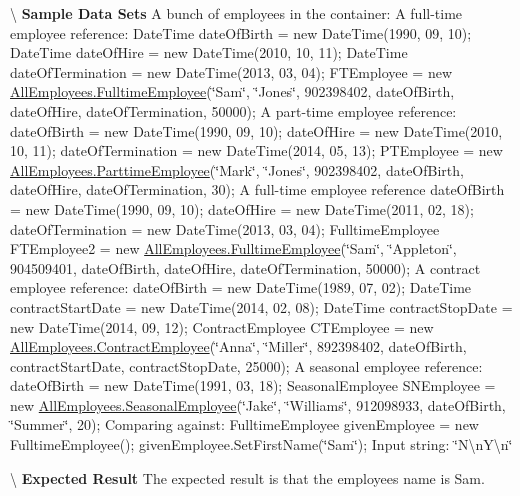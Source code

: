 \textbackslash{} {\bfseries  Sample Data Sets} A bunch of employees in the container\+: A full-\/time employee reference\+: Date\+Time date\+Of\+Birth = new Date\+Time(1990, 09, 10); Date\+Time date\+Of\+Hire = new Date\+Time(2010, 10, 11); Date\+Time date\+Of\+Termination = new Date\+Time(2013, 03, 04); F\+T\+Employee = new \hyperlink{class_all_employees_1_1_fulltime_employee}{All\+Employees.\+Fulltime\+Employee}(\char`\"{}\+Sam\char`\"{}, \char`\"{}\+Jones\char`\"{}, 902398402, date\+Of\+Birth, date\+Of\+Hire, date\+Of\+Termination, 50000); A part-\/time employee reference\+: date\+Of\+Birth = new Date\+Time(1990, 09, 10); date\+Of\+Hire = new Date\+Time(2010, 10, 11); date\+Of\+Termination = new Date\+Time(2014, 05, 13); P\+T\+Employee = new \hyperlink{class_all_employees_1_1_parttime_employee}{All\+Employees.\+Parttime\+Employee}(\char`\"{}\+Mark\char`\"{}, \char`\"{}\+Jones\char`\"{}, 902398402, date\+Of\+Birth, date\+Of\+Hire, date\+Of\+Termination, 30); A full-\/time employee reference date\+Of\+Birth = new Date\+Time(1990, 09, 10); date\+Of\+Hire = new Date\+Time(2011, 02, 18); date\+Of\+Termination = new Date\+Time(2013, 03, 04); Fulltime\+Employee F\+T\+Employee2 = new \hyperlink{class_all_employees_1_1_fulltime_employee}{All\+Employees.\+Fulltime\+Employee}(\char`\"{}\+Sam\char`\"{}, \char`\"{}\+Appleton\char`\"{}, 904509401, date\+Of\+Birth, date\+Of\+Hire, date\+Of\+Termination, 50000); A contract employee reference\+: date\+Of\+Birth = new Date\+Time(1989, 07, 02); Date\+Time contract\+Start\+Date = new Date\+Time(2014, 02, 08); Date\+Time contract\+Stop\+Date = new Date\+Time(2014, 09, 12); Contract\+Employee C\+T\+Employee = new \hyperlink{class_all_employees_1_1_contract_employee}{All\+Employees.\+Contract\+Employee}(\char`\"{}\+Anna\char`\"{}, \char`\"{}\+Miller\char`\"{}, 892398402, date\+Of\+Birth, contract\+Start\+Date, contract\+Stop\+Date, 25000); A seasonal employee reference\+: date\+Of\+Birth = new Date\+Time(1991, 03, 18); Seasonal\+Employee S\+N\+Employee = new \hyperlink{class_all_employees_1_1_seasonal_employee}{All\+Employees.\+Seasonal\+Employee}(\char`\"{}\+Jake\char`\"{}, \char`\"{}\+Williams\char`\"{}, 912098933, date\+Of\+Birth, \char`\"{}\+Summer\char`\"{}, 20); Comparing against\+: Fulltime\+Employee given\+Employee = new Fulltime\+Employee(); given\+Employee.\+Set\+First\+Name(\char`\"{}\+Sam\char`\"{}); Input string\+: \char`\"{}\+N\textbackslash{}n\+Y\textbackslash{}n\char`\"{}

\textbackslash{} {\bfseries  Expected Result} The expected result is that the employee\textquotesingle{}s name is Sam.

